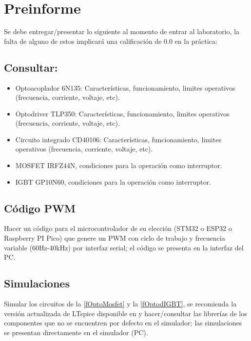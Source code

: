 \documentclass[12pt]{article}
\begin{document}
\newpage %

\section{Preinforme}
Se debe entregar/presentar lo siguiente al momento de entrar al laboratorio, la falta de alguno de estos implicará una calificación de 0.0 en la práctica:

\subsection{Consultar:}
\begin{itemize}
    \item Optoacoplador 6N135: Características, funcionamiento, limites operativos (frecuencia, corriente, voltaje, etc).
    \item Optodriver TLP350: Características, funcionamiento, limites operativos (frecuencia, corriente, voltaje, etc).
    \item Circuito integrado CD40106: Características, funcionamiento, limites operativos (frecuencia, corriente, voltaje, etc).
    \item MOSFET IRFZ44N, condiciones para la operación como interruptor.
    \item IGBT GP10N60, condiciones para la operación como interruptor.
\end{itemize}

\subsection{Código PWM}
Hacer un código para el microcontrolador de su elección (STM32 o ESP32 o Raspberry PI Pico) que genere un PWM con ciclo de trabajo y frecuencia variable (60Hz-40kHz) por interfaz serial; el código se presenta en la interfaz del PC.

\subsection{Simulaciones}
Simular los circuitos de la \cref{fOptoMosfet} y la \cref{fOptodIGBT}, se recomienda la versión actualizada de LTspice disponible en \cite{ltspice} y hacer/consultar las librerías de los componentes que no se encuentren por defecto en el simulador; las simulaciones se presentan directamente en el simulador (PC).

\end{document}
